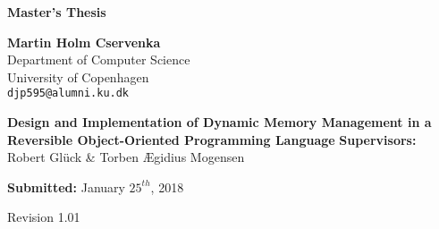 \begin{titlepage}

\begin{flushleft}
\vspace*{3cm}
\textbf{\huge{Master's Thesis}}

\vspace*{3mm}
\textbf{Martin Holm Cservenka} \\
Department of Computer Science \\
University of Copenhagen \\
\texttt{djp595@alumni.ku.dk} 


\vspace*{4cm}
\textbf{\huge{Design and Implementation of Dynamic Memory Management in a Reversible Object-Oriented Programming Language}}
\vfill
\textbf{Supervisors:} Robert Glück \& Torben Ægidius Mogensen

\textbf{Submitted:} January $25^{th}$, 2018

Revision 1.01
\end{flushleft}
\end{titlepage}
